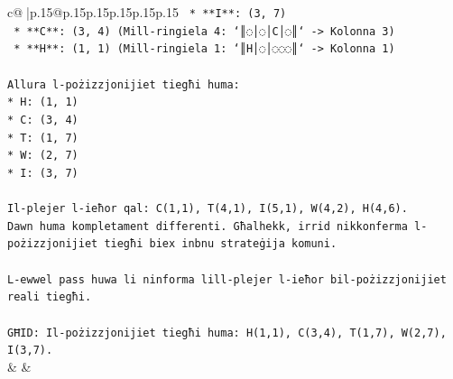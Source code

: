 \documentclass{article}
\begin{document}
{\begin{supertabular}{c@{$\;$}|p{.15\linewidth}@{}p{.15\linewidth}p{.15\linewidth}p{.15\linewidth}p{.15\linewidth}p{.15\linewidth}}
{{{\texttt{    *   **I**: (3, 7)} \\
\texttt{    *   **C**: (3, 4) (Mill{-}ringiela 4: `║◌│◌│C│◌║` {-}> Kolonna 3)} \\
\texttt{    *   **H**: (1, 1) (Mill{-}ringiela 1: `║H│◌│◌◌◌║` {-}> Kolonna 1)} \\
\\ 
\texttt{Allura l{-}pożizzjonijiet tiegħi huma:} \\
\texttt{*   H: (1, 1)} \\
\texttt{*   C: (3, 4)} \\
\texttt{*   T: (1, 7)} \\
\texttt{*   W: (2, 7)} \\
\texttt{*   I: (3, 7)} \\
\\ 
\texttt{Il{-}plejer l{-}ieħor qal: C(1,1), T(4,1), I(5,1), W(4,2), H(4,6).} \\
\texttt{Dawn huma kompletament differenti. Għalhekk, irrid nikkonferma l{-}pożizzjonijiet tiegħi biex inbnu strateġija komuni.} \\
\\ 
\texttt{L{-}ewwel pass huwa li ninforma lill{-}plejer l{-}ieħor bil{-}pożizzjonijiet reali tiegħi.} \\
\\ 
\texttt{GĦID: Il{-}pożizzjonijiet tiegħi huma: H(1,1), C(3,4), T(1,7), W(2,7), I(3,7).} \\
            }
        }
    }
    & & \\ \\


\end{supertabular}}
\end{document}
